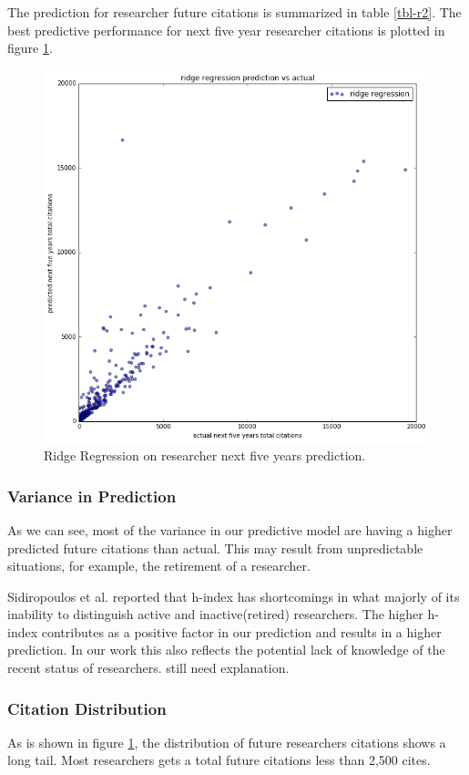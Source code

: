 

The prediction for researcher future citations is summarized in table \ref{tbl-r2}.
The best predictive performance for next five year researcher citations is plotted in figure \ref{researcher-prediction}.


\begin{figure}
\includegraphics[width=3 in]{fig/researcher-prediction.png}
\caption{Ridge Regression on researcher next five years prediction.}
\label{researcher-prediction}
\end{figure}




\subsubsection{Variance in Prediction}
As we can see, most of the variance in our predictive model are having a higher predicted future citations than actual. This may result from unpredictable situations, for example, the retirement of a researcher. 

Sidiropoulos et al. reported that h-index has shortcomings in what majorly of its inability to distinguish active and inactive(retired) researchers\cite{sidiropoulos2007generalized}. The higher h-index contributes as a positive factor in our prediction and results in a higher prediction. In our work this also reflects the potential lack of knowledge of the recent status of researchers.
{\sc still need explanation.}

\subsubsection{Citation Distribution}
As is shown in figure \ref{researcher-prediction}, the distribution of future researchers citations shows a long tail. 
Most researchers gets a total future citations less than 2,500 cites.

